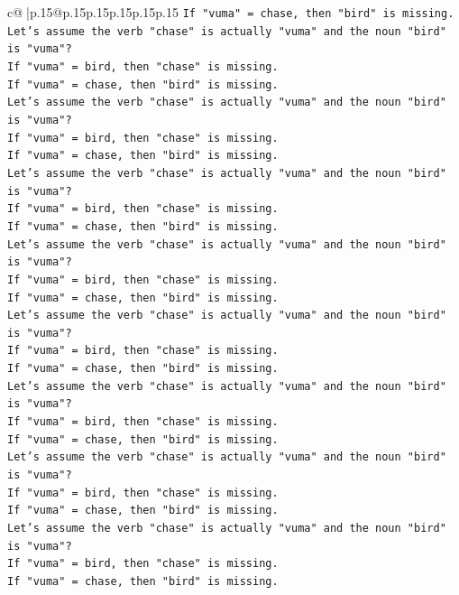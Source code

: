 \documentclass{article}
\begin{document}
{\begin{supertabular}{c@{$\;$}|p{.15\linewidth}@{}p{.15\linewidth}p{.15\linewidth}p{.15\linewidth}p{.15\linewidth}p{.15\linewidth}}
{{{\texttt{If "vuma" = chase, then "bird" is missing.} \\
\texttt{Let's assume the verb "chase" is actually "vuma" and the noun "bird" is "vuma"?} \\
\texttt{If "vuma" = bird, then "chase" is missing.} \\
\texttt{If "vuma" = chase, then "bird" is missing.} \\
\texttt{Let's assume the verb "chase" is actually "vuma" and the noun "bird" is "vuma"?} \\
\texttt{If "vuma" = bird, then "chase" is missing.} \\
\texttt{If "vuma" = chase, then "bird" is missing.} \\
\texttt{Let's assume the verb "chase" is actually "vuma" and the noun "bird" is "vuma"?} \\
\texttt{If "vuma" = bird, then "chase" is missing.} \\
\texttt{If "vuma" = chase, then "bird" is missing.} \\
\texttt{Let's assume the verb "chase" is actually "vuma" and the noun "bird" is "vuma"?} \\
\texttt{If "vuma" = bird, then "chase" is missing.} \\
\texttt{If "vuma" = chase, then "bird" is missing.} \\
\texttt{Let's assume the verb "chase" is actually "vuma" and the noun "bird" is "vuma"?} \\
\texttt{If "vuma" = bird, then "chase" is missing.} \\
\texttt{If "vuma" = chase, then "bird" is missing.} \\
\texttt{Let's assume the verb "chase" is actually "vuma" and the noun "bird" is "vuma"?} \\
\texttt{If "vuma" = bird, then "chase" is missing.} \\
\texttt{If "vuma" = chase, then "bird" is missing.} \\
\texttt{Let's assume the verb "chase" is actually "vuma" and the noun "bird" is "vuma"?} \\
\texttt{If "vuma" = bird, then "chase" is missing.} \\
\texttt{If "vuma" = chase, then "bird" is missing.} \\
\texttt{Let's assume the verb "chase" is actually "vuma" and the noun "bird" is "vuma"?} \\
\texttt{If "vuma" = bird, then "chase" is missing.} \\
\texttt{If "vuma" = chase, then "bird" is missing.} \\
}}}
\end{supertabular}}
\end{document}
